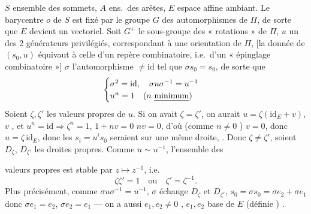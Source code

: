 \documentclass[11pt,a4paper]{article}
\begin{document}
$S$ ensemble des sommets, $A$ ens.\ des arêtes, $E$ espace affine ambiant.
Le barycentre $o$ de $S$ est fixé par le groupe $G$ des automorphismes de $\Pi$, de sorte que $E$ devient un vectoriel. Soit $G^{+}$ le sous-groupe des « rotations » de $\Pi$, $u$ un des 2 générateurs privilégiés, correspondant à une orientation  de $\Pi$,   [la donnée de $(s_0,u)$ équivaut à celle d'un repère combinatoire, i.e.\ d'un « épinglage combinatoire »] $\sigma$ l'automorphisme $\neq \mathrm{id}$ tel que $\sigma s_0 = s_0$, de sorte que
\[
\begin{cases}
\sigma^{2} = \mathrm{id}, \quad \sigma u \sigma^{-1} = u^{-1} \\
u^{n} = 1 \quad (n \text{ \uncertain{minimum}})
\end{cases}
\]
Soient $\zeta, \zeta'$ les valeurs propres de $u$. Si on avait $\zeta = \zeta'$, on aurait $u = \zeta(\mathrm{id}_E + v)$, $v$  , et $u^{n} = \mathrm{id} \Rightarrow \zeta^{n} = 1$, $1 + nv = 0$  $nv = 0$, d'où (comme $n \neq 0$ ) $v = 0$, donc $u = \zeta\,\mathrm{id}_E$, donc les $s_i = u^{i} s_0$ seraient sur une même droite, . Donc $\zeta \neq \zeta'$, soient $D_\zeta$, $D_{\zeta'}$ les droites propres.  Comme $u \sim u^{-1}$, l'ensemble des

valeurs propres est stable par $z \mapsto z^{-1}$, i.e.\ 
\[
\zeta\zeta' = 1 \quad\text{ou}\quad \zeta' = \zeta^{-1}.
\]
Plus précisément, comme $\sigma u \sigma^{-1} = u^{-1}$, $\sigma$ échange $D_\zeta$ et $D_{\zeta'}$,   $s_0 = \sigma s_0 = \sigma e_2 + \sigma e_1$ donc $\sigma e_1 = e_2$, $\sigma e_2 = e_1$ — on a aussi $e_1, e_2 \neq 0$ , \uncertain{\ill{}} $e_1, e_2$ base de $E$ (définie ) \struck{\ill{}}.
\end{document}
